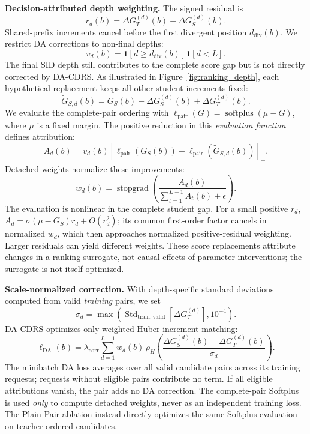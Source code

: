 \documentclass[sigconf, anonymous, review]{acmart}
\begin{document}
\textbf{Decision-attributed depth weighting.} The signed residual is
\begin{equation}
r_d(b)=\Delta G_T^{(d)}(b)-\Delta G_S^{(d)}(b).
\label{eq:residual}
\end{equation}
Shared-prefix increments cancel before the first divergent position
$d_{\mathrm{div}}(b)$. We restrict DA corrections to non-final depths:
\begin{equation}
v_d(b)=\mathbf1[d\ge d_{\mathrm{div}}(b)]
       \mathbf1[d<L].
\label{eq:valid-depth}
\end{equation}
The final SID depth still contributes to the complete score gap but
is not directly corrected by DA-CDRS. As illustrated in
Figure~\ref{fig:ranking_depth}, each hypothetical replacement keeps all
other student increments fixed:
\begin{equation}
\widetilde G_{S,d}(b)=G_S(b)-\Delta G_S^{(d)}(b)
+\Delta G_T^{(d)}(b).
\label{eq:cf-gap}
\end{equation}
We evaluate the complete-pair ordering with
$\ell_{\mathrm{pair}}(G)=\operatorname{softplus}(\mu-G)$,
where $\mu$ is a fixed margin. The positive reduction in this
\emph{evaluation function} defines attribution:
\begin{equation}
A_d(b)=v_d(b)\left[
\ell_{\mathrm{pair}}(G_S(b))-
\ell_{\mathrm{pair}}(\widetilde G_{S,d}(b))
\right]_+.
\label{eq:attribution}
\end{equation}
Detached weights normalize these improvements:
\begin{equation}
w_d(b)=\operatorname{stopgrad}\left(
\frac{A_d(b)}{\sum_{t=1}^{L-1}A_t(b)+\epsilon}
\right).
\label{eq:weights}
\end{equation}
The evaluation is nonlinear in the complete student gap.
For a small positive $r_d$,
$A_d=\sigma(\mu-G_S)r_d+O(r_d^2)$; its common first-order
factor cancels in normalized $w_d$, which then approaches
normalized positive-residual weighting. Larger residuals can
yield different weights. These score replacements attribute
changes in a ranking surrogate, not causal effects of
parameter interventions; the surrogate is not itself optimized.

\textbf{Scale-normalized correction.} With
depth-specific standard deviations computed from valid \emph{training}
pairs, we set
\begin{equation}
\sigma_d=\max\left(
\operatorname{Std}_{\mathrm{train,valid}}[
\Delta G_T^{(d)}],10^{-4}\right).
\label{eq:scale}
\end{equation}
DA-CDRS optimizes only weighted Huber increment matching:
\begin{equation}
\ell_{\mathrm{DA}}(b)=
\lambda_{\mathrm{corr}}\sum_{d=1}^{L-1}
w_d(b)\,\rho_H\!\left(
\frac{\Delta G_S^{(d)}(b)-\Delta G_T^{(d)}(b)}{\sigma_d}
\right).
\label{eq:correction}
\end{equation}
The minibatch DA loss averages over all valid candidate pairs
across its training requests; requests without eligible pairs
contribute no term. If all eligible attributions vanish, the pair
adds no DA correction. The complete-pair Softplus is used \emph{only} to
compute detached weights, never as an independent training loss.
The Plain Pair ablation instead directly optimizes the same
Softplus evaluation on teacher-ordered candidates.
\end{document}
